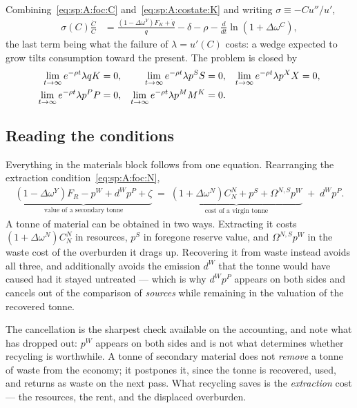  Combining~\eqref{eq:sp:A:foc:C}
and~\eqref{eq:sp:A:costate:K} and writing $\sigma\equiv-Cu''/u'$,
\begin{align}
\sigma\left(C\right)\frac{\dot C}{C}
&= \frac{\left(1-\Delta\omega^Y\right)F_K+\dot q}{q}-\delta-\rho
-\frac{d}{dt}\ln\!\left(1+\Delta\omega^C\right),
\label{eq:sp:A:euler}
\end{align}
the last term being what the failure of $\lambda=u'(C)$ costs: a wedge expected to grow tilts
consumption toward the present. The problem is closed by
\begin{align}
\lim_{t\to\infty}e^{-\rho t}\lambda q K &= 0,
&
\lim_{t\to\infty}e^{-\rho t}\lambda p^S S &= 0,
&
\lim_{t\to\infty}e^{-\rho t}\lambda p^X X &= 0,
\notag\\
\lim_{t\to\infty}e^{-\rho t}\lambda p^P P &= 0,
&
\lim_{t\to\infty}e^{-\rho t}\lambda p^M M^K &= 0 .
&&
\label{eq:sp:A:tvc}
\end{align}


\subsection{Reading the conditions}\label{sec:sp:A:reading}

 Everything in the materials block follows from one equation.
Rearranging the extraction condition~\eqref{eq:sp:A:foc:N},
\begin{align}
\underbrace{\left(1-\Delta\omega^Y\right)F_R-p^W+d^Wp^P+\zeta}_{\text{value of a secondary tonne}}
\;=\;
\underbrace{\left(1+\Delta\omega^N\right)C^N_N+p^S+\Omega^{N,S}p^W}_{\text{cost of a virgin tonne}}
\;+\;d^Wp^P .
\label{eq:sp:A:arbitrage}
\end{align}
A tonne of material can be obtained in two ways. Extracting it costs
$\left(1+\Delta\omega^N\right)C^N_N$ in resources, $p^S$ in foregone reserve value, and
$\Omega^{N,S}p^W$ in the waste cost of the overburden it drags up. Recovering it from waste instead
avoids all three, and additionally avoids the emission $d^W$ that the tonne would have caused had it
stayed untreated --- which is why $d^Wp^P$ appears on both sides and cancels out of the comparison of
\emph{sources} while remaining in the valuation of the recovered tonne.

The cancellation is the sharpest check available on the accounting, and note what has dropped out:
$p^W$ appears on both sides and is not what determines whether recycling is worthwhile. A tonne of
secondary material does not \emph{remove} a tonne of waste from the economy; it postpones it, since
the tonne is recovered, used, and returns as waste on the next pass. What recycling saves is the
\emph{extraction} cost --- the resources, the rent, and the displaced overburden.

